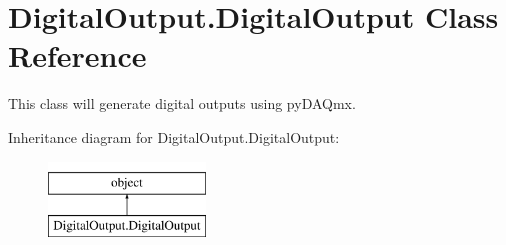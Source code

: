 \hypertarget{class_digital_output_1_1_digital_output}{\section{Digital\-Output.\-Digital\-Output Class Reference}
\label{class_digital_output_1_1_digital_output}
}


This class will generate digital outputs using py\-D\-A\-Qmx.  


Inheritance diagram for Digital\-Output.\-Digital\-Output\-:\begin{figure}[H]
\begin{center}
\leavevmode
\includegraphics[height=2.000000cm]{class_digital_output_1_1_digital_output}
\end{center}
\end{figure}
